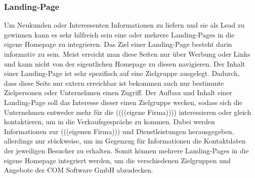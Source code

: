 \subsubsection{Landing-Page}
Um Neukunden oder Interessenten Informationen zu liefern und sie als Lead zu gewinnen kann es sehr hilfreich sein eine oder mehrere Landing-Pages in die eigene Homepage zu integrieren. Das Ziel einer Landing-Page besteht darin informativ zu sein. Meist erreicht man diese Seiten nur über Werbung oder Links und kann nicht von der eigentlichen Homepage zu diesen navigieren. 
\newline 
Der Inhalt einer Landing-Page ist sehr spezifisch auf eine Zielgruppe ausgelegt. Dadurch, dass diese Seite nur extern erreichbar ist bekommen auch nur bestimmte Zielpersonen oder Unternehmen einen Zugriff. Der Aufbau und Inhalt einer Landing-Page soll das Interesse dieser einen Zielgruppe wecken, sodass sich die Unternehmen entweder mehr für die ((((eigene Firma)))) interessieren oder gleich kontaktieren, um in die Verkaufsgespräche zu kommen. Dabei werden Informationen zur (((eigenen Firma))) und Dienstleistungen herausgegeben, allerdings nur stückweise, um im Gegenzug für Informationen die Kontaktdaten der jeweiligen Besucher zu erhalten.
\newline 
Somit können mehrere Landing-Pages in die eigene Homepage integriert werden, um die verschiedenen Zielgruppen und Angebote der COM Software GmbH abzudecken. 

